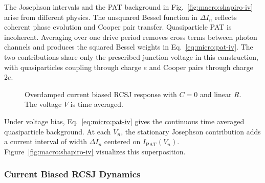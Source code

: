             The Josephson intervals and the PAT background in Fig.~\ref{fig:macro:shapiro-iv} arise from different physics. The unsquared Bessel function in $\Delta I_n$ reflects coherent phase evolution and Cooper pair transfer. Quasiparticle PAT is incoherent. Averaging over one drive period removes cross terms between photon channels and produces the squared Bessel weights in Eq.~\eqref{eq:micro:pat-iv}. The two contributions share only the prescribed junction voltage in this construction, with quasiparticles coupling through charge $e$ and Cooper pairs through charge $2e$.

            \begin{figure}
                \captionsetup{format=plain}%
                \begin{minipage}{2.0in}
                    \centering
                    \caption{
                        Under voltage bias, SIS curves show PAT. Vertical bars mark coherent phase locking.
                    }
                    \label{fig:macro:shapiro-iv}
                \end{minipage}
                \hfill%
                \begin{minipage}{2.0in}
                    \centering
                    \caption{
                        Overdamped current biased RCSJ response with $C=0$ and linear $R$. The voltage $\overline V$ is time averaged.
                    }
                \label{fig:macro:shapiro-rsj}
                \end{minipage}
            \end{figure}
            
            Under voltage bias, Eq.~\eqref{eq:micro:pat-iv} gives the continuous time averaged quasiparticle background. At each $V_n$, the stationary Josephson contribution adds a current interval of width $\Delta I_n$ centered on $I_\mathrm{PAT}(V_n)$. Figure~\ref{fig:macro:shapiro-iv} visualizes this superposition.

        \subsubsection*{Current Biased RCSJ Dynamics}

